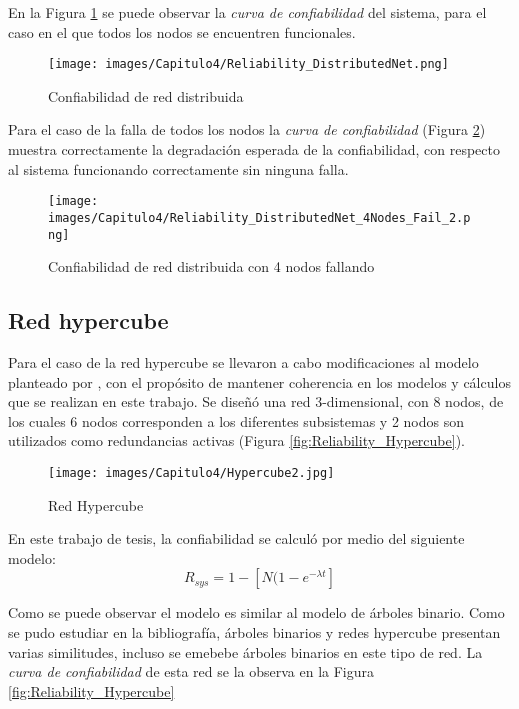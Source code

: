 En la Figura \ref{fig:reliability_distributedNet} se puede observar la \textit{curva de confiabilidad} del sistema, para el caso en el que todos los nodos se encuentren funcionales.

\begin{figure}[H]
 \centering
 \texttt{[image: images/Capitulo4/Reliability\_DistributedNet.png]}
  \caption{Confiabilidad de red distribuida}
\label{fig:reliability_distributedNet}
\end{figure}


Para el caso de la falla de todos los nodos la \textit{curva de confiabilidad} (Figura \ref{fig:reliability_distributedNet_4Nodes_Fail}) muestra correctamente la degradación esperada de la confiabilidad, con respecto al sistema funcionando correctamente sin ninguna falla.

\begin{figure}[H]
 \centering
 \texttt{[image: images/Capitulo4/Reliability\_DistributedNet\_4Nodes\_Fail\_2.png]}
  \caption{Confiabilidad de red distribuida con 4 nodos fallando}
\label{fig:reliability_distributedNet_4Nodes_Fail}
\end{figure}

\subsection{Red hypercube}
Para el caso de la red hypercube se llevaron a cabo modificaciones al modelo planteado por \cite{Mostafa14}, con el propósito de mantener coherencia en los modelos y cálculos que se realizan en este trabajo. Se diseñó una red 3-dimensional, con 8 nodos,  de los cuales 6 nodos corresponden a los diferentes subsistemas y 2 nodos son utilizados como redundancias activas (Figura \ref{fig:Reliability_Hypercube}).

\begin{figure}[H]
 \centering
 \texttt{[image: images/Capitulo4/Hypercube2.jpg]}
  \caption{Red Hypercube}
\label{fig:Hypercube}
\end{figure}

En este trabajo de tesis, la confiabilidad se calculó por medio del siguiente modelo: $$R_{sys} = 1- [N (1 - e^{- \lambda t}]$$

Como se puede observar el modelo es similar al modelo de árboles binario. Como se pudo estudiar en la bibliografía, árboles binarios y redes hypercube presentan varias similitudes, incluso se emebebe árboles binarios en este tipo de red. La \textit{curva de confiabilidad} de esta red se la observa en la Figura \ref{fig:Reliability_Hypercube}

